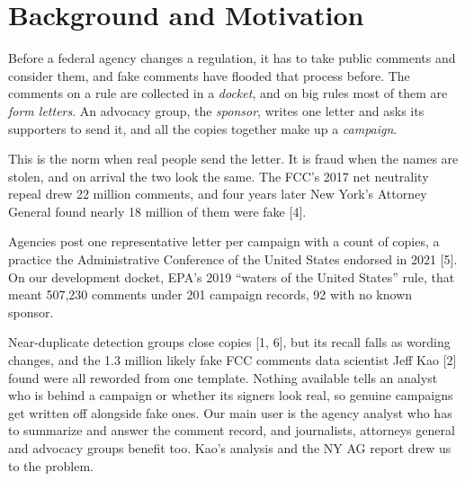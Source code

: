 \documentclass[10pt,twocolumn]{article}
\begin{document}

\section{Background and Motivation}

Before a federal agency changes a regulation, it has to take public comments and consider them,
and fake comments have flooded that process before.
The comments on a rule are collected in a \emph{docket}, and on big rules most of them are
\emph{form letters}. An advocacy group, the \emph{sponsor}, writes one letter and asks its supporters
to send it, and all the copies together make up a \emph{campaign}.

This is the norm when real people send the letter. It is fraud when the names are stolen, and on
arrival the two look the same. The FCC's 2017 net neutrality repeal drew 22 million comments, and
four years later New York's Attorney General found nearly 18 million of them were fake [4].

Agencies post one representative letter per campaign with a count of copies, a practice the
Administrative Conference of the United States endorsed in 2021 [5]. On our development docket, EPA's 2019
``waters of the United States'' rule, that meant 507{,}230 comments under 201 campaign records,
92 with no known sponsor.

Near-duplicate detection groups close copies [1, 6], but its recall falls as wording changes, and
the 1.3 million likely fake FCC comments data scientist Jeff Kao [2] found were all reworded from one template. Nothing available tells an
analyst who is behind a campaign or whether its signers look real, so genuine campaigns get written
off alongside fake ones. Our main user is the agency analyst who has to summarize and answer the
comment record, and journalists, attorneys general and advocacy groups benefit too. Kao's analysis
and the NY AG report drew us to the problem.
\end{document}
